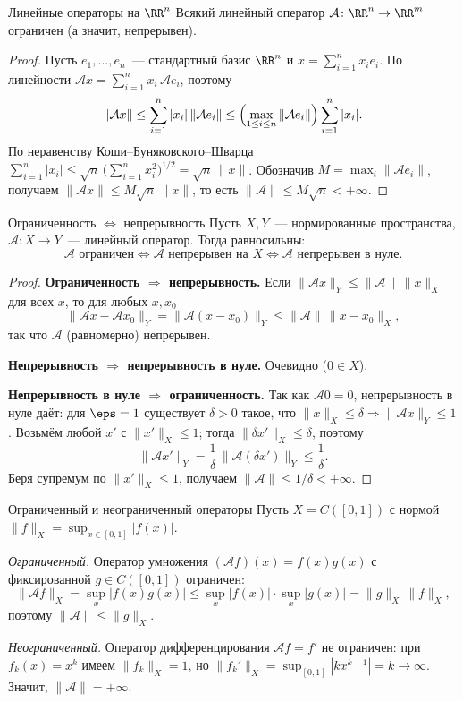 \begin{Proposition}{Линейные операторы на $\RR^n$}{}
	Всякий линейный оператор $\mathcal{A}\colon \RR^n \to \RR^m$ ограничен (а значит, непрерывен). 
\end{Proposition}

\begin{proof}
	Пусть $e_1, \ldots, e_n$~--- стандартный базис $\RR^n$ и $x = \sum_{i=1}^{n} x_i e_i$. По линейности $\mathcal{A}x = \sum_{i=1}^{n} x_i\,\mathcal{A}e_i$, поэтому
	\[
	\|\mathcal{A}x\| \le \sum_{i=1}^{n} |x_i|\,\|\mathcal{A}e_i\|
	\le \Bigl( \max_{1 \le i \le n} \|\mathcal{A}e_i\| \Bigr) \sum_{i=1}^{n} |x_i|.
	\]
	По неравенству Коши--Буняковского--Шварца $\sum_{i=1}^{n} |x_i| \le \sqrt{n}\,\bigl(\sum_{i=1}^{n} x_i^2\bigr)^{1/2} = \sqrt{n}\,\|x\|$. Обозначив $M = \max_i \|\mathcal{A}e_i\|$, получаем $\|\mathcal{A}x\| \le M\sqrt{n}\,\|x\|$, то есть $\|\mathcal{A}\| \le M\sqrt{n} < +\infty$.
\end{proof}

\begin{Proposition}{Ограниченность $\Leftrightarrow$ непрерывность}{}
	Пусть $X, Y$~--- нормированные пространства, $\mathcal{A}\colon X \to Y$~--- линейный оператор. Тогда равносильны:
	\[
	\mathcal{A} \text{ ограничен} \iff \mathcal{A} \text{ непрерывен на } X \iff \mathcal{A} \text{ непрерывен в нуле.}
	\]
\end{Proposition}

\begin{proof}
	\textbf{Ограниченность $\Rightarrow$ непрерывность.} Если $\|\mathcal{A}x\|_Y \le \|\mathcal{A}\|\,\|x\|_X$ для всех $x$, то для любых $x, x_0$
	\[
	\|\mathcal{A}x - \mathcal{A}x_0\|_Y = \|\mathcal{A}(x - x_0)\|_Y \le \|\mathcal{A}\|\,\|x - x_0\|_X,
	\]
	так что $\mathcal{A}$ (равномерно) непрерывен.

	\textbf{Непрерывность $\Rightarrow$ непрерывность в нуле.} Очевидно ($0 \in X$).

	\textbf{Непрерывность в нуле $\Rightarrow$ ограниченность.} Так как $\mathcal{A}0 = 0$, непрерывность в нуле даёт: для $\eps = 1$ существует $\delta > 0$ такое, что $\|x\|_X \le \delta \Rightarrow \|\mathcal{A}x\|_Y \le 1$. Возьмём любой $x'$ с $\|x'\|_X \le 1$; тогда $\|\delta x'\|_X \le \delta$, поэтому
	\[
	\|\mathcal{A}x'\|_Y = \frac{1}{\delta}\,\|\mathcal{A}(\delta x')\|_Y \le \frac{1}{\delta}.
	\]
	Беря супремум по $\|x'\|_X \le 1$, получаем $\|\mathcal{A}\| \le 1/\delta < +\infty$.
\end{proof}

\begin{Example}{Ограниченный и неограниченный операторы}{}
	Пусть $X = C([0,1])$ с нормой $\|f\|_X = \sup_{x \in [0,1]} |f(x)|$.

	\emph{Ограниченный.} Оператор умножения $(\mathcal{A}f)(x) = f(x)g(x)$ с фиксированной $g \in C([0,1])$ ограничен:
	\[
	\|\mathcal{A}f\|_X = \sup_x |f(x)g(x)| \le \sup_x|f(x)|\cdot\sup_x|g(x)| = \|g\|_X\,\|f\|_X,
	\]
	поэтому $\|\mathcal{A}\| \le \|g\|_X$.

	\emph{Неограниченный.} Оператор дифференцирования $\mathcal{A}f = f'$ не ограничен: при $f_k(x) = x^k$ имеем $\|f_k\|_X = 1$, но $\|f_k'\|_X = \sup_{[0,1]} |k x^{k-1}| = k \to \infty$. Значит, $\|\mathcal{A}\| = +\infty$.
\end{Example}

